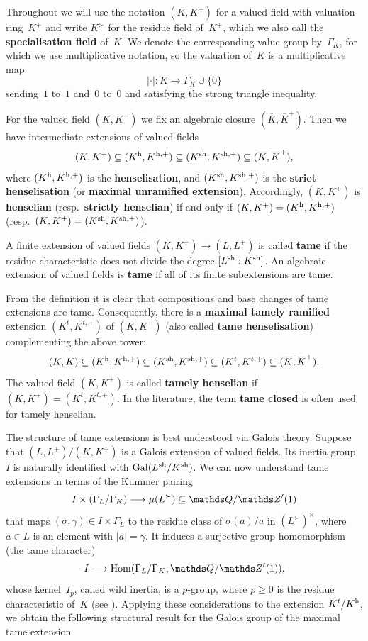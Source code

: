 Throughout we will use the notation $(K,K^+)$ for a valued field with valuation ring~$K^+$ and write $K^\succ$ for the residue field of~$K^+$, which we also call the \textbf{specialisation field} of~$K$.
We denote the corresponding value group by~$\Gamma_K$, for which we use multiplicative notation, so the valuation of~$K$ is a multiplicative map
\[
 \lvert \cdot \rvert \colon K \longrightarrow \Gamma_K \cup \{0\}
\]
sending~$1$ to~$1$ and~$0$ to~$0$ and satisfying the strong triangle inequality.

For the valued field $(K,K^+)$ we fix an algebraic closure $(\overline{K},\overline{K}^+)$.
Then we have intermediate extensions of valued fields
\[
 (K,K^+) \subseteq (K^{\rm h},K^{{\rm h},+}) \subseteq (K^{\rm sh},K^{{\rm sh},+}) \subseteq (\overline{K},\overline{K}^+),
\]
where $(K^{\rm h},K^{{\rm h},+})$ is the {\bf henselisation}, and $(K^{\rm sh},K^{{\rm sh},+})$ is the {\bf strict henselisation} (or {\bf maximal unramified extension}).
Accordingly, $(K,K^+)$ is {\bf henselian} (resp.\ {\bf strictly henselian}) if and  only if $(K,K^+) = (K^{\rm h},K^{{\rm h},+})$ (resp.\ $(K,K^+) = (K^{\rm sh},K^{{\rm sh},+})$).

\begin{defi}
\label{defi:tame-extension-of-valued-fields}
    A finite extension of valued fields $(K,K^+) \to (L,L^+)$ is called \textbf{tame} if the residue characteristic does not divide the degree $[L^{\rm sh}:K^{\rm sh}]$.
    An algebraic extension of valued fields is \textbf{tame} if all of its finite subextensions are tame.
\end{defi}

From the definition it is clear that compositions and base changes of tame extensions are tame.
Consequently, there is a \textbf{maximal tamely ramified} extension $(K^t,K^{t,+})$ of $(K,K^+)$ (also called \textbf{tame henselisation}) complementing the above tower:
\[
 (K,K) \subseteq (K^{\rm h},K^{{\rm h},+}) \subseteq (K^{\rm sh},K^{{\rm sh},+}) \subseteq (K^t,K^{t,+}) \subseteq (\overline{K},\overline{K}^+).
\]
The valued field $(K,K^+)$ is called {\bf tamely henselian} if $(K,K^+) = (K^t,K^{t,+})$.
In the literature, the term {\bf tame closed} is often used for tamely henselian.

The structure of tame extensions is best understood via Galois theory.
Suppose that $(L,L^+)/(K,K^+)$ is a Galois extension of valued fields.
Its inertia group~$I$ is naturally identified with $\operatorname{Gal}(L^{\rm sh}/K^{\rm sh})$.
We can now understand tame extensions in terms of the Kummer pairing
\[
 I \times (\Gamma_L/\Gamma_K) \longrightarrow \mu(L^\succ) \subseteq \bQ/\bZ'(1) 
\]
that maps $(\sigma,\gamma) \in I \times \Gamma_L$ to the residue class of $\sigma(a)/a$ in $(L^\succ)^\times$, where $a \in L$ is an element with $\lvert a \rvert = \gamma$.
It induces a surjective group homomorphism (the tame character)
\begin{equation} \label{Kummer-hom}
 I \longrightarrow \Hom(\Gamma_L/\Gamma_K,\bQ/\bZ'(1)), 
\end{equation}
whose kernel~$I_p$, called wild inertia, is a $p$-group, where $p \ge 0$ is the residue characteristic of~$K$ (see \cite[Proposition~6.2.12]{GabberRamero}).
Applying these considerations to the extension $K^t/K^{\rm h}$, we obtain the following structural result for the Galois group of the maximal tame extension


